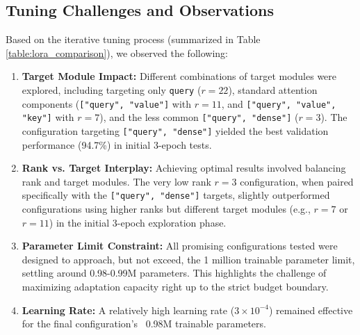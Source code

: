 \documentclass[twoside, 11pt]{article}
\begin{document}
\subsection{Tuning Challenges and Observations}
Based on the iterative tuning process (summarized in Table \ref{table:lora_comparison}), we observed the following:
\begin{enumerate}
    \item \textbf{Target Module Impact:} Different combinations of target modules were explored, including targeting only \texttt{query} ($r=22$), standard attention components (\texttt{["query", "value"]} with $r=11$, and \texttt{["query", "value", "key"]} with $r=7$), and the less common \texttt{["query", "dense"]} ($r=3$). The configuration targeting \texttt{["query", "dense"]} yielded the best validation performance (94.7\%) in initial 3-epoch tests.
    \item \textbf{Rank vs. Target Interplay:} Achieving optimal results involved balancing rank and target modules. The very low rank $r=3$ configuration, when paired specifically with the \texttt{["query", "dense"]} targets, slightly outperformed configurations using higher ranks but different target modules (e.g., $r=7$ or $r=11$) in the initial 3-epoch exploration phase.
    \item \textbf{Parameter Limit Constraint:} All promising configurations tested were designed to approach, but not exceed, the 1 million trainable parameter limit, settling around 0.98-0.99M parameters. This highlights the challenge of maximizing adaptation capacity right up to the strict budget boundary.
    \item \textbf{Learning Rate:} A relatively high learning rate ($3 \times 10^{-4}$) remained effective for the final configuration's ~0.98M trainable parameters.
\end{enumerate}
\end{document}
